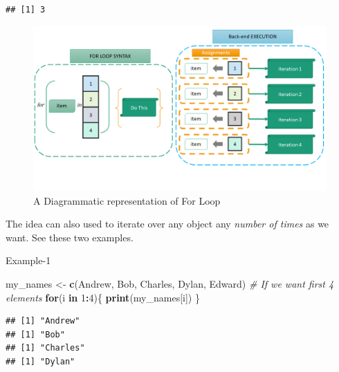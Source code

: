 \documentclass[
]{book}
\newenvironment{Shaded}{\begin{snugshade}}{\end{snugshade}}
\newcommand{\CommentTok}[1]{\textcolor[rgb]{0.56,0.35,0.01}{\textit{#1}}}
\newcommand{\ControlFlowTok}[1]{\textcolor[rgb]{0.13,0.29,0.53}{\textbf{#1}}}
\newcommand{\DecValTok}[1]{\textcolor[rgb]{0.00,0.00,0.81}{#1}}
\newcommand{\FunctionTok}[1]{\textcolor[rgb]{0.13,0.29,0.53}{\textbf{#1}}}
\newcommand{\NormalTok}[1]{#1}
\newcommand{\OtherTok}[1]{\textcolor[rgb]{0.56,0.35,0.01}{#1}}
\newcommand{\SpecialCharTok}[1]{\textcolor[rgb]{0.81,0.36,0.00}{\textbf{#1}}}
\newcommand{\StringTok}[1]{\textcolor[rgb]{0.31,0.60,0.02}{#1}}
\begin{document}
\begin{verbatim}
## [1] 3
\end{verbatim}

\begin{figure}

{\centering \includegraphics[width=0.99\linewidth]{images/for_loop} 

}

\caption{A Diagrammatic representation of For Loop}\label{fig:unnamed-chunk-168}
\end{figure}

The idea can also used to iterate over any object any \emph{number of times} as we want. See these two examples.

Example-1

\begin{Shaded}
\begin{Highlighting}[]
\NormalTok{my\_names }\OtherTok{\textless{}{-}} \FunctionTok{c}\NormalTok{(}\StringTok{\textquotesingle{}Andrew\textquotesingle{}}\NormalTok{, }\StringTok{\textquotesingle{}Bob\textquotesingle{}}\NormalTok{, }\StringTok{\textquotesingle{}Charles\textquotesingle{}}\NormalTok{, }\StringTok{\textquotesingle{}Dylan\textquotesingle{}}\NormalTok{, }\StringTok{\textquotesingle{}Edward\textquotesingle{}}\NormalTok{)}
\CommentTok{\# If we want first 4 elements}
\ControlFlowTok{for}\NormalTok{(i }\ControlFlowTok{in} \DecValTok{1}\SpecialCharTok{:}\DecValTok{4}\NormalTok{)\{}
  \FunctionTok{print}\NormalTok{(my\_names[i])}
\NormalTok{\}}
\end{Highlighting}
\end{Shaded}

\begin{verbatim}
## [1] "Andrew"
## [1] "Bob"
## [1] "Charles"
## [1] "Dylan"
\end{verbatim}
\end{document}
